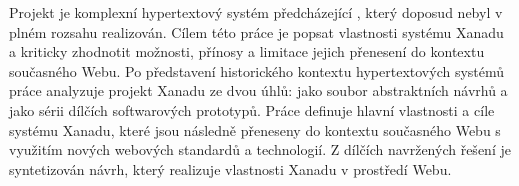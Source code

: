 Projekt  je komplexní hypertextový systém předcházející , který doposud nebyl v plném rozsahu realizován.
Cílem této práce je popsat vlastnosti systému Xanadu a kriticky zhodnotit možnosti, přínosy a limitace jejich přenesení do kontextu současného Webu.
Po představení historického kontextu hypertextových systémů práce analyzuje projekt Xanadu ze dvou úhlů: jako soubor abstraktních návrhů a jako sérii dílčích softwarových prototypů. Práce definuje hlavní vlastnosti a cíle systému Xanadu, které jsou následně přeneseny do kontextu současného Webu s využitím nových webových standardů a technologií. Z dílčích navržených řešení je syntetizován návrh, který realizuje vlastnosti Xanadu v prostředí Webu.